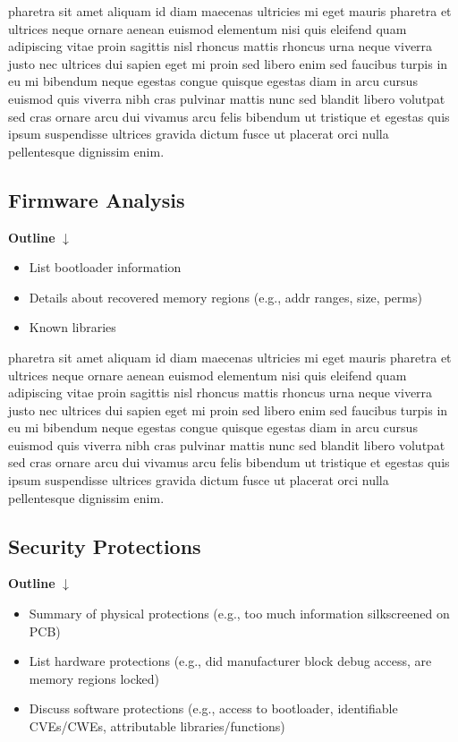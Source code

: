 pharetra sit amet aliquam id diam maecenas ultricies mi eget mauris pharetra et ultrices neque ornare aenean euismod elementum nisi quis eleifend quam adipiscing vitae proin sagittis nisl rhoncus mattis rhoncus urna neque viverra justo nec ultrices dui sapien eget mi proin sed libero enim sed faucibus turpis in eu mi bibendum neque egestas congue quisque egestas diam in arcu cursus euismod quis viverra nibh cras pulvinar mattis nunc sed blandit libero volutpat sed cras ornare arcu dui vivamus arcu felis bibendum ut tristique et egestas quis ipsum suspendisse ultrices gravida dictum fusce ut placerat orci nulla pellentesque dignissim enim.

\subsection{Firmware Analysis} \label{firmwareanalysis}

\textbf{Outline}
$\downarrow$

\begin{itemize}
    \item List bootloader information
    \item Details about recovered memory regions (e.g., addr ranges, size, perms)
    \item Known libraries
\end{itemize}

pharetra sit amet aliquam id diam maecenas ultricies mi eget mauris pharetra et ultrices neque ornare aenean euismod elementum nisi quis eleifend quam adipiscing vitae proin sagittis nisl rhoncus mattis rhoncus urna neque viverra justo nec ultrices dui sapien eget mi proin sed libero enim sed faucibus turpis in eu mi bibendum neque egestas congue quisque egestas diam in arcu cursus euismod quis viverra nibh cras pulvinar mattis nunc sed blandit libero volutpat sed cras ornare arcu dui vivamus arcu felis bibendum ut tristique et egestas quis ipsum suspendisse ultrices gravida dictum fusce ut placerat orci nulla pellentesque dignissim enim.

\subsection{Security Protections} \label{securityprotections}

\textbf{Outline}
$\downarrow$

\begin{itemize}
    \item Summary of physical protections (e.g., too much information silkscreened on PCB)
    \item List hardware protections (e.g., did manufacturer block debug access, are memory regions locked)
    \item Discuss software protections (e.g., access to bootloader, identifiable CVEs/CWEs, attributable libraries/functions)
\end{itemize}

